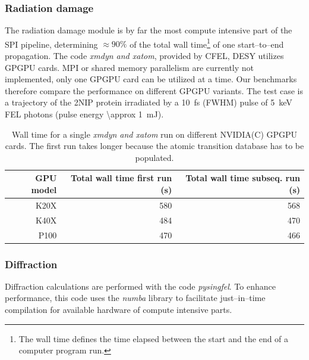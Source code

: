 \documentclass[10pt]{scrartcl}
\begin{document}
\subsubsection{Radiation damage}
The radiation damage module is by far the most compute intensive part of the SPI
pipeline, determining $\approx 90\%$ of the total wall time\footnote{The wall
  time defines the time elapsed between the start and the end of a computer
  program run.} of one
start--to--end propagation. The code \textit{xmdyn and xatom}, provided by
CFEL, DESY \cite{Jurek2016} utilizes GPGPU cards. MPI or shared memory
parallelism are currently not implemented, only one GPGPU card can
be utilized at a time. Our benchmarks therefore compare the performance on
different GPGPU variants. The test case is a trajectory of the 2NIP protein
irradiated by a \SI{10}{\femto\second} (FWHM) pulse of
\SI{5}{\kilo\electronvolt} FEL photons (pulse energy \SI{\approx 1}{\milli\joule}).
%
\begin{table}
  \centering
  \begin{tabular}{rrr}
    \textbf{GPU model} & \textbf{Total wall time first run (s)} & \textbf{Total
    wall time subseq. run (s)}\\
    \hline
    K20X  & 580 & 568 \\
    K40X  & 484 & 470 \\
    P100  & 470 & 466 \\
  \end{tabular}
  \caption{Wall time for a single \textit{xmdyn and xatom} run on different
NVIDIA(C) GPGPU cards.
The first run takes longer because the atomic transition database
has to be populated.}
  \label{tab:xmdyn_performance_nvidia}
\end{table}
%
\subsubsection{Diffraction}
%
Diffraction calculations are performed with the code \textit{pysingfel}. To
enhance performance, this code uses the \textit{numba} library to facilitate
just--in--time compilation for available hardware of compute intensive parts.
\end{document}
